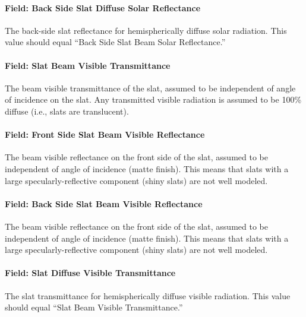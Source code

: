 \paragraph{Field: Back Side Slat Diffuse Solar Reflectance}\label{field-back-side-slat-diffuse-solar-reflectance}

The back-side slat reflectance for hemispherically diffuse solar radiation. This value should equal ``Back Side Slat Beam Solar Reflectance.''

\paragraph{Field: Slat Beam Visible Transmittance}\label{field-slat-beam-visible-transmittance}

The beam visible transmittance of the slat, assumed to be independent of angle of incidence on the slat. Any transmitted visible radiation is assumed to be 100\% diffuse (i.e., slats are translucent).

\paragraph{Field: Front Side Slat Beam Visible Reflectance}\label{field-front-side-slat-beam-visible-reflectance}

The beam visible reflectance on the front side of the slat, assumed to be independent of angle of incidence (matte finish). This means that slats with a large specularly-reflective component (shiny slats) are not well modeled.

\paragraph{Field: Back Side Slat Beam Visible Reflectance}\label{field-back-side-slat-beam-visible-reflectance}

The beam visible reflectance on the front side of the slat, assumed to be independent of angle of incidence (matte finish). This means that slats with a large specularly-reflective component (shiny slats) are not well modeled.

\paragraph{Field: Slat Diffuse Visible Transmittance}\label{field-slat-diffuse-visible-transmittance}

The slat transmittance for hemispherically diffuse visible radiation. This value should equal ``Slat Beam Visible Transmittance.''

